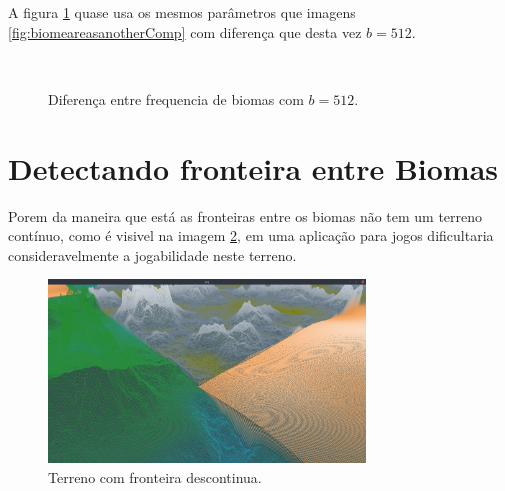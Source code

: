 A figura \ref{fig:biomeareasanotherCompx} quase usa os mesmos parâmetros que imagens \ref{fig:biomeareasanotherComp}
com diferença que desta vez $b = 512$.

\begin{figure}[H]
     \centering
     \hspace{0.1cm}
     \\
     \caption{Diferença entre frequencia de biomas com $b = 512$.}
     
     \label{fig:biomeareasanotherCompx}
\end{figure}

\section{Detectando fronteira entre Biomas}

Porem da maneira que está as fronteiras entre os biomas não tem um terreno
contínuo, como é visivel na imagem \ref{fig:descontinuos}, em uma aplicação para jogos
dificultaria consideravelmente
a jogabilidade neste terreno. %

\begin{figure}[H]
    \centering
    \includegraphics[width=0.75\textwidth]{figuras/descontinuos.png}
    \caption{Terreno com fronteira descontinua.}
    \label{fig:descontinuos}
\end{figure}

